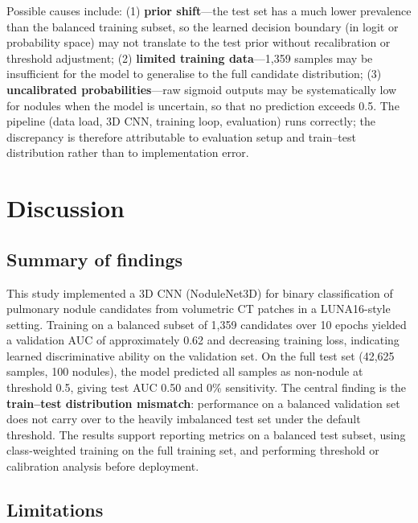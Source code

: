 \documentclass[11pt,a4paper]{article}
\begin{document}
Possible causes include: (1) \textbf{prior shift}---the test set has a much lower prevalence than the balanced training subset, so the learned decision boundary (in logit or probability space) may not translate to the test prior without recalibration or threshold adjustment; (2) \textbf{limited training data}---1,359 samples may be insufficient for the model to generalise to the full candidate distribution; (3) \textbf{uncalibrated probabilities}---raw sigmoid outputs may be systematically low for nodules when the model is uncertain, so that no prediction exceeds 0.5. The pipeline (data load, 3D CNN, training loop, evaluation) runs correctly; the discrepancy is therefore attributable to evaluation setup and train--test distribution rather than to implementation error.

\section{Discussion}

\subsection{Summary of findings}

This study implemented a 3D CNN (NoduleNet3D) for binary classification of pulmonary nodule candidates from volumetric CT patches in a LUNA16-style setting. Training on a balanced subset of 1,359 candidates over 10 epochs yielded a validation AUC of approximately 0.62 and decreasing training loss, indicating learned discriminative ability on the validation set. On the full test set (42,625 samples, 100 nodules), the model predicted all samples as non-nodule at threshold 0.5, giving test AUC 0.50 and 0\% sensitivity. The central finding is the \textbf{train--test distribution mismatch}: performance on a balanced validation set does not carry over to the heavily imbalanced test set under the default threshold. The results support reporting metrics on a balanced test subset, using class-weighted training on the full training set, and performing threshold or calibration analysis before deployment.

\subsection{Limitations}
\end{document}
